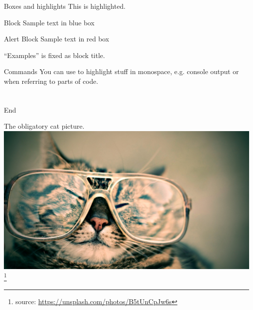 \begin{frame}{Boxes and highlights}
This is \alert{highlighted}.
\begin{block}{Block}
Sample text in blue box
\end{block}
\begin{alertblock}{Alert Block}
Sample text in red box
\end{alertblock}
\begin{examples}
``Examples'' is fixed as block title.
\end{examples}
\end{frame}

\begin{frame}{Commands}
  You can use  to highlight stuff in monospace, e.g.
  console output or when referring to parts of code.
\end{frame}

\part{} %
\begin{frame}{End}
  \begin{center}
    The obligatory cat picture.\\
    \includegraphics[height=.7\textheight]{images/octavio-fossatti-37556.eps}
    \footnote[frame]{source:
    \href{https://unsplash.com/photos/B5tUnCpJw6s}
    {https://unsplash.com/photos/B5tUnCpJw6s}}
  \end{center}
\end{frame}


\appendix

